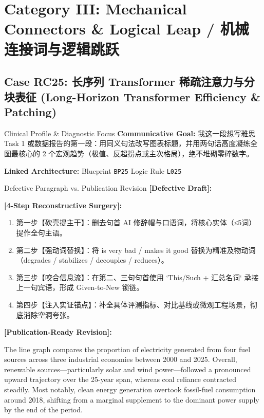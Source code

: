 \section{Category III: Mechanical Connectors \& Logical Leap / 机械连接词与逻辑跳跃}
\subsection{Case RC25: 长序列 Transformer 稀疏注意力与分块表征 (Long-Horizon Transformer Efficiency \& Patching)}\label{case:RC25}
\begin{ConceptBox}{Clinical Profile \& Diagnostic Focus}
\textbf{Communicative Goal:} 我这一段想写雅思 Task 1 或数据报告的第一段：用同义句法改写图表标题，并用两句话高度凝练全图最核心的 2 个宏观趋势（极值、反超拐点或主次格局），绝不堆砌零碎数字。\par
\textbf{Linked Architecture:} Blueprint \texttt{BP25} \enspace\textbar\enspace Logic Rule \texttt{L025}
\end{ConceptBox}
\begin{ExampleBox}{Defective Paragraph vs. Publication Revision}
\textbf{\color{TargetHighlight}[Defective Draft]:}\par
{}\par\vspace{6pt}
\textbf{\color{AcadForest}[4-Step Reconstructive Surgery]:}
\begin{enumerate}[label=\textbf{\color{AcadNavy}Step \arabic*:}, leftmargin=2em]
  \item 第一步【砍壳提主干】：删去句首 AI 修辞帽与口语词，将核心实体（≤5词）提作全句主语。
  \item 第二步【强动词替换】：将 is very bad / makes it good 替换为精准及物动词（degrades / stabilizes / decouples / reduces）。
  \item 第三步【咬合信息流】：在第二、三句句首使用 `This/Such + 汇总名词` 承接上一句宾语，形成 Given-to-New 锁链。
  \item 第四步【注入实证锚点】：补全具体评测指标、对比基线或微观工程场景，彻底消除空洞夸张。
\end{enumerate}\vspace{4pt}
\textbf{\color{AcadNavy}[Publication-Ready Revision]:}\par
The line graph compares the proportion of electricity generated from four fuel sources across three industrial economies between 2000 and 2025. Overall, renewable sources---particularly solar and wind power---followed a pronounced upward trajectory over the 25-year span, whereas coal reliance contracted steadily. Most notably, clean energy generation overtook fossil-fuel consumption around 2018, shifting from a marginal supplement to the dominant power supply by the end of the period.
\end{ExampleBox}
